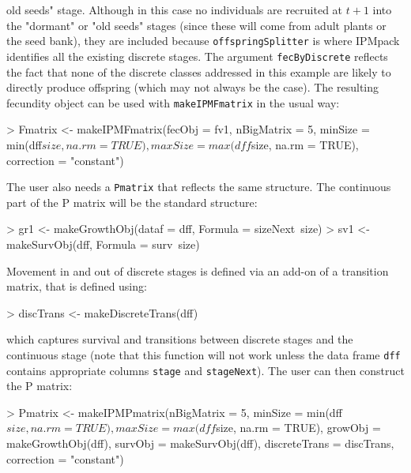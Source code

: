 \documentclass{article}
\begin{document}
old seeds" stage. Although in this case no individuals are recruited at $t+1$
into the "dormant" or "old seeds" stages (since these will come from adult
plants or the seed bank), they are included because {\tt offspringSplitter} is
where IPMpack identifies all the existing discrete stages. The argument {\tt fecByDiscrete} reflects the fact that none of the discrete classes addressed in this example are likely to directly produce offspring (which may not always be the case). The resulting fecundity object can be used with {\tt makeIPMFmatrix} in the usual way:
\begin{Schunk}
\begin{Sinput}
> Fmatrix <- makeIPMFmatrix(fecObj = fv1, nBigMatrix = 5, 
                              minSize = min(dff$size, na.rm = TRUE), 
                              maxSize = max(dff$size, na.rm = TRUE), 
                              correction = "constant")
\end{Sinput}
\end{Schunk}
The user also needs a {\tt Pmatrix} that reflects the same structure. The
continuous part of the P matrix will be the standard structure:
\begin{Schunk}
\begin{Sinput}
> gr1 <- makeGrowthObj(dataf = dff, 
                        Formula = sizeNext~size)
> sv1 <- makeSurvObj(dff,  Formula = surv~size)
\end{Sinput}
\end{Schunk}
Movement in and out of discrete stages is defined via an add-on of a transition matrix, that is defined using: 
\begin{Schunk}
\begin{Sinput}
> discTrans <- makeDiscreteTrans(dff)
\end{Sinput}
\end{Schunk}
which captures survival and transitions between discrete stages and the
continuous stage (note that this function will not work unless the data frame
{\tt dff} contains appropriate columns {\tt stage} and {\tt stageNext}).  The
user can then construct the P matrix:
\begin{Schunk}
\begin{Sinput}
> Pmatrix <- makeIPMPmatrix(nBigMatrix = 5, 	
                              minSize = min(dff$size, na.rm = TRUE), 
                              maxSize = max(dff$size, na.rm = TRUE), 
                              growObj = makeGrowthObj(dff), 
                              survObj = makeSurvObj(dff), 
                              discreteTrans = discTrans, 
                              correction = "constant")
\end{Sinput}
\end{Schunk}
\end{document}

